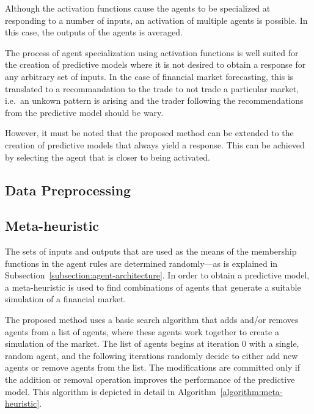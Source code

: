 \documentclass{ieeeaccess}
\begin{document}
Although the activation functions cause the agents to be specialized at
responding to a number of inputs, an activation of multiple agents is
possible. In this case, the outputs of the agents is averaged. %

The process of agent specialization using activation functions is well suited
for the creation of predictive models where it is not desired to obtain a
response for any arbitrary set of inputs. In the case of financial market
forecasting, this is translated to a recommandation to the trade to not trade a
particular market, i.e.\ an unkown pattern is arising and the trader following
the recommendations from the predictive model should be wary.

However, it must be noted that the proposed method can be extended to the
creation of predictive models that always yield a response. This can be
achieved by selecting the agent that is closer to being activated.


\subsection{Data Preprocessing}
\label{subsection:data-preprocessing}



\subsection{Meta-heuristic}
\label{subsection:meta-heuristic}

The sets of inputs and outputs that are used as the means of the
membership functions in the agent rules are determined randomly---as
is explained in Subsection~\ref{subsection:agent-architecture}. In
order to obtain a predictive model, a meta-heuristic is used to find
combinations of agents that generate a suitable simulation of a
financial market.

The proposed method uses a basic search algorithm that adds and/or removes
agents from a list of agents, where these agents work together to create a
simulation of the market. The list of agents begins at iteration 0 with a
single, random agent, and the following iterations randomly decide to either
add new agents or remove agents from the list. The modifications are committed
only if the addition or removal operation improves the performance of the
predictive model. This algorithm is depicted in detail in
Algorithm~\ref{algorithm:meta-heuristic}.
\end{document}

